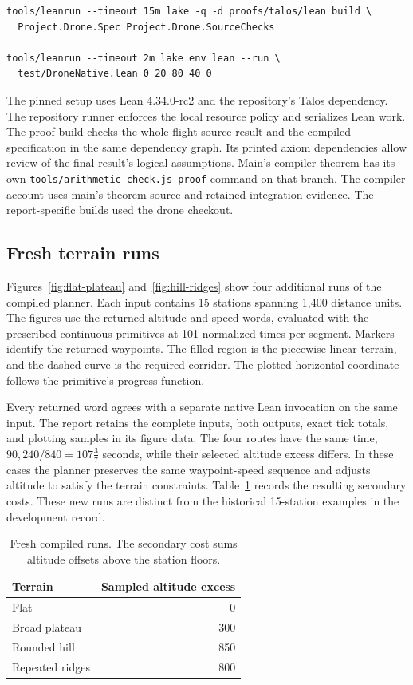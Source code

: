 \documentclass[11pt]{article}
\begin{document}
\begin{lstlisting}
tools/leanrun --timeout 15m lake -q -d proofs/talos/lean build \
  Project.Drone.Spec Project.Drone.SourceChecks

tools/leanrun --timeout 2m lake env lean --run \
  test/DroneNative.lean 0 20 80 40 0
\end{lstlisting}

The pinned setup uses Lean 4.34.0-rc2 and the repository's Talos dependency.  The repository runner enforces the local resource policy and serializes Lean work.  The proof build checks the whole-flight source result and the compiled specification in the same dependency graph.  Its printed axiom dependencies allow review of the final result's logical assumptions.  Main's compiler theorem has its own \texttt{tools/arithmetic-check.js proof} command on that branch.  The compiler account uses main's theorem source and retained integration evidence.  The report-specific builds used the drone checkout.


\subsection{Fresh terrain runs}

Figures~\ref{fig:flat-plateau} and~\ref{fig:hill-ridges} show four additional runs of the compiled planner.  Each input contains 15 stations spanning 1,400 distance units.  The figures use the returned altitude and speed words, evaluated with the prescribed continuous primitives at 101 normalized times per segment.  Markers identify the returned waypoints.  The filled region is the piecewise-linear terrain, and the dashed curve is the required corridor.  The plotted horizontal coordinate follows the primitive's progress function.

Every returned word agrees with a separate native Lean invocation on the same input.  The report retains the complete inputs, both outputs, exact tick totals, and plotting samples in its figure data.  The four routes have the same time, $90{,}240/840=107\tfrac{3}{7}$ seconds, while their selected altitude excess differs.  In these cases the planner preserves the same waypoint-speed sequence and adjusts altitude to satisfy the terrain constraints.  Table~\ref{tab:runs} records the resulting secondary costs.  These new runs are distinct from the historical 15-station examples in the development record.

\begin{table}[htbp]
\centering
\begin{tabular}{lr}
\toprule
Terrain & Sampled altitude excess\\
\midrule
Flat & 0\\
Broad plateau & 300\\
Rounded hill & 850\\
Repeated ridges & 800\\
\bottomrule
\end{tabular}
\caption{Fresh compiled runs.  The secondary cost sums altitude offsets above the station floors.}
\label{tab:runs}
\end{table}
\end{document}
